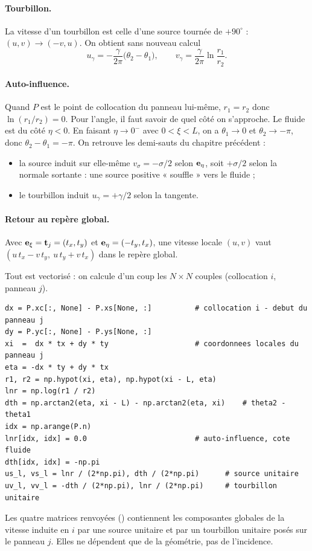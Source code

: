\paragraph{Tourbillon.} La vitesse d'un tourbillon est celle d'une source tournée de $+90^\circ$ : $(u,v)\to(-v,u)$. On obtient sans nouveau calcul
\[
u_\gamma=-\frac{\gamma}{2\pi}\big(\theta_2-\theta_1\big),\qquad v_\gamma=\frac{\gamma}{2\pi}\ln\frac{r_1}{r_2}.
\]

\paragraph{Auto-influence.} Quand $P$ est le point de collocation du panneau lui-même, $r_1=r_2$ donc $\ln(r_1/r_2)=0$. Pour l'angle, il faut savoir de quel côté on s'approche. Le fluide est du côté $\eta<0$. En faisant $\eta\to0^-$ avec $0<\xi<L$, on a $\theta_1\to0$ et $\theta_2\to-\pi$, donc $\theta_2-\theta_1=-\pi$. On retrouve les demi-sauts du chapitre précédent :
\begin{itemize}
\item la source induit sur elle-même $v_\sigma=-\sigma/2$ selon $\mathbf{e}_\eta$, soit $+\sigma/2$ selon la normale sortante : une source positive « souffle » vers le fluide ;
\item le tourbillon induit $u_\gamma=+\gamma/2$ selon la tangente.
\end{itemize}

\paragraph{Retour au repère global.} Avec $\mathbf{e}_\xi=\mathbf{t}_j=(t_x,t_y)$ et $\mathbf{e}_\eta=(-t_y,t_x)$, une vitesse locale $(u,v)$ vaut $(u\,t_x-v\,t_y,\ u\,t_y+v\,t_x)$ dans le repère global.

\begin{codebox}
Tout est vectorisé : on calcule d'un coup les $N\times N$ couples (collocation $i$, panneau $j$).
\begin{lstlisting}
dx = P.xc[:, None] - P.xs[None, :]          # collocation i - debut du panneau j
dy = P.yc[:, None] - P.ys[None, :]
xi  =  dx * tx + dy * ty                    # coordonnees locales du panneau j
eta = -dx * ty + dy * tx
r1, r2 = np.hypot(xi, eta), np.hypot(xi - L, eta)
lnr = np.log(r1 / r2)
dth = np.arctan2(eta, xi - L) - np.arctan2(eta, xi)    # theta2 - theta1
idx = np.arange(P.n)
lnr[idx, idx] = 0.0                         # auto-influence, cote fluide
dth[idx, idx] = -np.pi
us_l, vs_l = lnr / (2*np.pi), dth / (2*np.pi)      # source unitaire
uv_l, vv_l = -dth / (2*np.pi), lnr / (2*np.pi)     # tourbillon unitaire
\end{lstlisting}
Les quatre matrices renvoyées () contiennent les composantes globales de la vitesse induite en $i$ par une source unitaire et par un tourbillon unitaire posés sur le panneau $j$. Elles ne dépendent que de la géométrie, pas de l'incidence.
\end{codebox}

